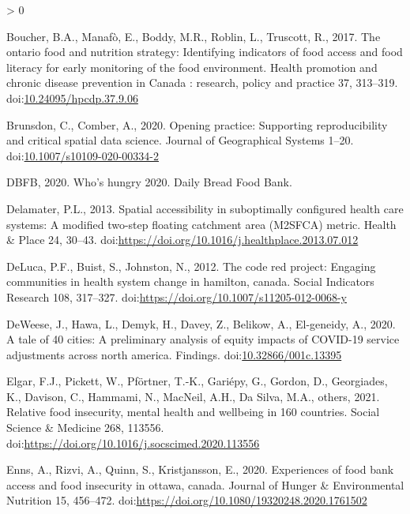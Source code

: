 \documentclass[]{elsarticle} %
\newlength{\cslhangindent}
\newenvironment{CSLReferences}[2] %
 {%
  \setlength{\parindent}{0pt}
  \ifodd #1 \everypar{\setlength{\hangindent}{\cslhangindent}}\ignorespaces\fi
  \ifnum #2 > 0
  \setlength{\parskip}{#2\baselineskip}
  \fi
 }%
 {}
\begin{document}
\begin{CSLReferences}{1}{0}
\leavevmode\hypertarget{ref-boucher2017ontario}{}%
Boucher, B.A., Manafò, E., Boddy, M.R., Roblin, L., Truscott, R., 2017.
The ontario food and nutrition strategy: Identifying indicators of food
access and food literacy for early monitoring of the food environment.
Health promotion and chronic disease prevention in Canada : research,
policy and practice 37, 313--319.
doi:\href{https://doi.org/10.24095/hpcdp.37.9.06}{10.24095/hpcdp.37.9.06}

\leavevmode\hypertarget{ref-brunsdon2020opening}{}%
Brunsdon, C., Comber, A., 2020. Opening practice: Supporting
reproducibility and critical spatial data science. Journal of
Geographical Systems 1--20.
doi:\href{https://doi.org/10.1007/s10109-020-00334-2}{10.1007/s10109-020-00334-2}

\leavevmode\hypertarget{ref-dbfb2020}{}%
DBFB, 2020. Who's hungry 2020. Daily Bread Food Bank.

\leavevmode\hypertarget{ref-delamater2013spatial}{}%
Delamater, P.L., 2013. Spatial accessibility in suboptimally configured
health care systems: A modified two-step floating catchment area
(M2SFCA) metric. Health \& Place 24, 30--43.
doi:\url{https://doi.org/10.1016/j.healthplace.2013.07.012}

\leavevmode\hypertarget{ref-deluca2012code}{}%
DeLuca, P.F., Buist, S., Johnston, N., 2012. The code red project:
Engaging communities in health system change in hamilton, canada. Social
Indicators Research 108, 317--327.
doi:\url{https://doi.org/10.1007/s11205-012-0068-y}

\leavevmode\hypertarget{ref-deweese2020tale}{}%
DeWeese, J., Hawa, L., Demyk, H., Davey, Z., Belikow, A., El-geneidy,
A., 2020. A tale of 40 cities: A preliminary analysis of equity impacts
of COVID-19 service adjustments across north america. Findings.
doi:\href{https://doi.org/10.32866/001c.13395}{10.32866/001c.13395}

\leavevmode\hypertarget{ref-elgar2021relative}{}%
Elgar, F.J., Pickett, W., Pförtner, T.-K., Gariépy, G., Gordon, D.,
Georgiades, K., Davison, C., Hammami, N., MacNeil, A.H., Da Silva, M.A.,
others, 2021. Relative food insecurity, mental health and wellbeing in
160 countries. Social Science \& Medicine 268, 113556.
doi:\url{https://doi.org/10.1016/j.socscimed.2020.113556}

\leavevmode\hypertarget{ref-enns2020experiences}{}%
Enns, A., Rizvi, A., Quinn, S., Kristjansson, E., 2020. Experiences of
food bank access and food insecurity in ottawa, canada. Journal of
Hunger \& Environmental Nutrition 15, 456--472.
doi:\url{https://doi.org/10.1080/19320248.2020.1761502}


\end{CSLReferences}
\end{document}
